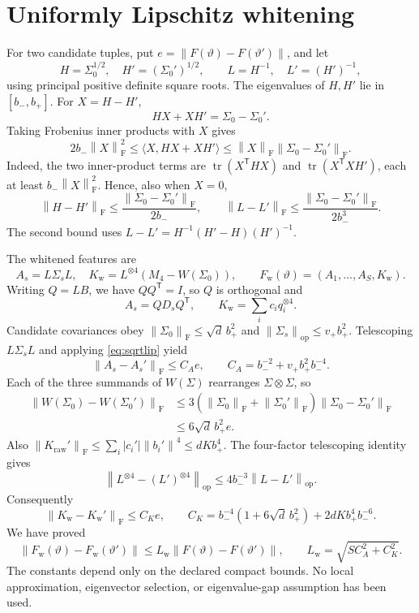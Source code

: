 \documentclass[11pt,a4paper]{article}
\numberwithin{equation}{section}
\newcommand{\T}{\mathsf T}
\newcommand{\F}{\mathrm F}
\newcommand{\op}{\mathrm{op}}
\newcommand{\norm}[1]{\left\lVert #1\right\rVert}
\DeclareMathOperator{\tr}{tr}
\begin{document}
\section{Uniformly Lipschitz whitening}\label{sec:whitening}
For two candidate tuples, put
\(e=\norm{F(\vartheta)-F(\vartheta')}\), and let
\[
 H=\Sigma_0^{1/2},\quad H'=(\Sigma_0')^{1/2},\qquad
 L=H^{-1},\quad L'=(H')^{-1},
\]
using principal positive definite square roots.
The eigenvalues of \(H,H'\) lie in \([b_-,b_+]\).
For \(X=H-H'\),
\[
 HX+XH'=\Sigma_0-\Sigma_0'.
\]
Taking Frobenius inner products with \(X\) gives
\[
 2b_-\norm X_{\F}^2
 \le\langle X,HX+XH'\rangle
 \le\norm X_{\F}\norm{\Sigma_0-\Sigma_0'}_{\F}.
\]
Indeed, the two inner-product terms are
\(\tr(X^\T HX)\) and \(\tr(X^\T XH')\), each at least
\(b_-\norm X_{\F}^2\). Hence, also when \(X=0\),
\begin{equation}\label{eq:sqrtlip}
 \norm{H-H'}_{\F}\le\frac{\norm{\Sigma_0-\Sigma_0'}_{\F}}{2b_-},
 \qquad
 \norm{L-L'}_{\F}\le\frac{\norm{\Sigma_0-\Sigma_0'}_{\F}}{2b_-^3}.
\end{equation}
The second bound uses \(L-L'=H^{-1}(H'-H)(H')^{-1}\).

The whitened features are
\[
 A_s=L\Sigma_sL,\quad
 K_{\mathrm w}=L^{\otimes4}(M_4-W(\Sigma_0)),\qquad
 F_{\mathrm w}(\vartheta)=(A_1,\ldots,A_S,K_{\mathrm w}).
\]
Writing \(Q=LB\), we have \(QQ^\T=I\), so \(Q\) is orthogonal and
\begin{equation}\label{eq:whitened}
 A_s=QD_sQ^\T,\qquad K_{\mathrm w}=\sum_i c_iq_i^{\otimes4}.
\end{equation}
Candidate covariances obey
\(\norm{\Sigma_0}_{\F}\le\sqrt d\,b_+^2\) and
\(\norm{\Sigma_s}_{\op}\le v_+b_+^2\).
Telescoping \(L\Sigma_sL\) and applying \eqref{eq:sqrtlip} yield
\[
 \norm{A_s-A_s'}_{\F}\le C_Ae,\qquad
 C_A=b_-^{-2}+v_+b_+^2b_-^{-4}.
\]
Each of the three summands of \(W(\Sigma)\) rearranges
\(\Sigma\otimes\Sigma\), so
\begin{align*}
 \norm{W(\Sigma_0)-W(\Sigma_0')}_{\F}
 &\le3(\norm{\Sigma_0}_{\F}+\norm{\Sigma_0'}_{\F})
                \norm{\Sigma_0-\Sigma_0'}_{\F}\\
 &\le6\sqrt d\,b_+^2e.
\end{align*}
Also \(\norm{K_{\mathrm{raw}}'}_{\F}
\le\sum_i|c_i'|\norm{b_i'}^4\le dKb_+^4\).
The four-factor telescoping identity gives
\[
 \norm{L^{\otimes4}-(L')^{\otimes4}}_{\op}
 \le4b_-^{-3}\norm{L-L'}_{\op}.
\]
Consequently
\[
 \norm{K_{\mathrm w}-K_{\mathrm w}'}_{\F}\le C_Ke,\qquad
 C_K=b_-^{-4}(1+6\sqrt d\,b_+^2)+2dKb_+^4b_-^{-6}.
\]
We have proved
\begin{equation}\label{eq:whitenlip}
 \norm{F_{\mathrm w}(\vartheta)-F_{\mathrm w}(\vartheta')}
 \le L_{\mathrm w}\norm{F(\vartheta)-F(\vartheta')},\qquad
 L_{\mathrm w}=\sqrt{SC_A^2+C_K^2}.
\end{equation}
The constants depend only on the declared compact bounds.
No local approximation, eigenvector selection, or eigenvalue-gap
assumption has been used.
\end{document}
